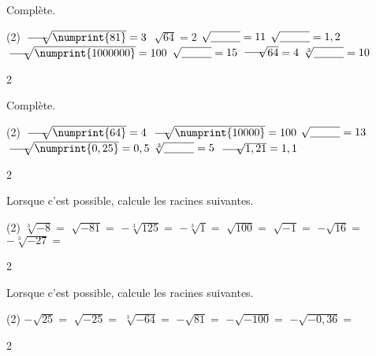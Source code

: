 \documentclass[a4paper,11pt]{report}
\begin{document}
\begin{exop}{
Complète.
\begin{tasks}(2)
    \task $\sqrt[\underline{{\color{white}XXX}}]{\numprint{81}}=3$
    \task $\sqrt[\underline{~~~~}]{64}=2$
    \task $\sqrt{\underline{{\color{white}XXX}}}=11$
    \task $\sqrt{\underline{{\color{white}XXX}}}=1,2$
    \task $\sqrt[\underline{{\color{white}XXX}}]{\numprint{1000000}}=100$
    \task $\sqrt{\underline{{\color{white}XXX}}}=15$
    \task $\sqrt[\underline{{\color{white}XXX}}]{64}=4$
    \task $\sqrt[3]{\underline{{\color{white}XXX}}}=10$
    
\end{tasks}
}{2}    
\end{exop}


\begin{exop}{
Complète.
\begin{tasks}(2)
    \task $\sqrt[\underline{{\color{white}XXX}}]{\numprint{64}}=4$
    \task $\sqrt[\underline{~~~~}]{\numprint{10000}}=100$
    \task $\sqrt{\underline{{\color{white}XXX}}}=13$
    \task $\sqrt[\underline{{\color{white}XXX}}]{\numprint{0,25}}=0,5$
    \task $\sqrt[3]{\underline{{\color{white}XXX}}}=5$
    \task $\sqrt[\underline{{\color{white}XXX}}]{1,21}=1,1$
    
\end{tasks}
}{2}    
\end{exop}


\begin{exop}{
Lorsque c'est possible, calcule les racines suivantes.
\begin{tasks}(2)
    \task $\sqrt[3]{-8}=$
    \task $\sqrt{-81}=$
    \task $-\sqrt[3]{125}=$
    \task $-\sqrt[3]{1}=$
    \task $\sqrt{100}=$
    \task $\sqrt{-1}=$
    \task $-\sqrt{16}=$
    \task $-\sqrt[3]{-27}=$
\end{tasks}
}{2}    
\end{exop}

\begin{exop}{
Lorsque c'est possible, calcule les racines suivantes.
\begin{tasks}(2)
    \task $-\sqrt{25}=$
    \task $\sqrt{-25}=$
    \task $\sqrt[3]{-64}=$
    \task $-\sqrt{81}=$
    \task $-\sqrt{-100}=$
    \task $-\sqrt{-0,36}=$
\end{tasks}
}{2}    
\end{exop}
\end{document}
